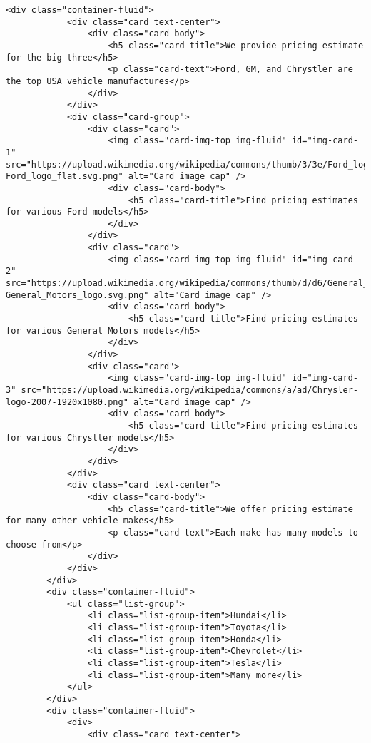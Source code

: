 \begin{lstlisting}[style=htmlcssjs]
        <div class="container-fluid">
            <div class="card text-center">
                <div class="card-body">
                    <h5 class="card-title">We provide pricing estimate for the big three</h5>
                    <p class="card-text">Ford, GM, and Chrystler are the top USA vehicle manufactures</p>
                </div>
            </div>
            <div class="card-group">
                <div class="card">
                    <img class="card-img-top img-fluid" id="img-card-1" src="https://upload.wikimedia.org/wikipedia/commons/thumb/3/3e/Ford_logo_flat.svg/2880px-Ford_logo_flat.svg.png" alt="Card image cap" />
                    <div class="card-body">
                        <h5 class="card-title">Find pricing estimates for various Ford models</h5>
                    </div>
                </div>
                <div class="card">
                    <img class="card-img-top img-fluid" id="img-card-2" src="https://upload.wikimedia.org/wikipedia/commons/thumb/d/d6/General_Motors_logo.svg/480px-General_Motors_logo.svg.png" alt="Card image cap" />
                    <div class="card-body">
                        <h5 class="card-title">Find pricing estimates for various General Motors models</h5>
                    </div>
                </div>
                <div class="card">
                    <img class="card-img-top img-fluid" id="img-card-3" src="https://upload.wikimedia.org/wikipedia/commons/a/ad/Chrysler-logo-2007-1920x1080.png" alt="Card image cap" />
                    <div class="card-body">
                        <h5 class="card-title">Find pricing estimates for various Chrystler models</h5>
                    </div>
                </div>
            </div>
            <div class="card text-center">
                <div class="card-body">
                    <h5 class="card-title">We offer pricing estimate for many other vehicle makes</h5>
                    <p class="card-text">Each make has many models to choose from</p>
                </div>
            </div>
        </div>
        <div class="container-fluid">
            <ul class="list-group">
                <li class="list-group-item">Hundai</li>
                <li class="list-group-item">Toyota</li>
                <li class="list-group-item">Honda</li>
                <li class="list-group-item">Chevrolet</li>
                <li class="list-group-item">Tesla</li>
                <li class="list-group-item">Many more</li>
            </ul>
        </div>
        <div class="container-fluid">
            <div>
                <div class="card text-center">

\end{lstlisting}
